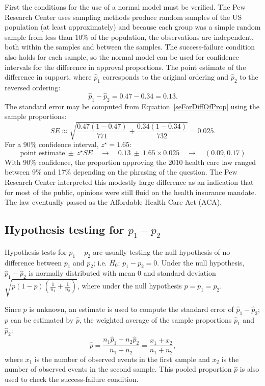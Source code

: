 \begin{example}
{}
First the conditions for the use of a normal model must be verified. The Pew Research Center uses sampling methods produce random samples of the US population (at least approximately) and because each group was a simple random sample from less than 10\% of the population, the observations are independent, both within the samples and between the samples. The success-failure condition also holds for each sample, so the normal model can be used for confidence intervals for the difference in approval proportions.  The point estimate of the difference in support, where $\hat{p}_1$ corresponds to the original ordering and $\hat{p}_2$ to the reversed ordering:
$$\hat{p}_{1} - \hat{p}_{2} = 0.47 - 0.34 = 0.13.$$
The standard error may be computed from Equation~\eqref{seForDiffOfProp} using the sample proportions:
$$SE \approx \sqrt{\frac{0.47(1-0.47)}{771} + \frac{0.34(1-0.34)}{732}} = 0.025.$$
For a 90\% confidence interval, $z^{\star} = 1.65$:
$$\text{point estimate} \ \pm\ z^{\star}SE \quad \to \quad 0.13 \ \pm\ 1.65 \times  0.025 \quad \to \quad (0.09, 0.17)$$
With 90\% confidence, the proportion approving the 2010 health care law ranged between 9\% and 17\% depending on the phrasing of the question. The Pew Research Center interpreted this modestly large difference as an indication that for most of the public, opinions were still fluid on the health insurance mandate.  The law eventually passed as the Affordable Health Care Act (ACA).
\end{example}


\subsection{Hypothesis testing for $p_1 -p_2$}

Hypothesis tests for $p_1 - p_2$ are usually testing the null hypothesis of no difference between $p_1$ and $p_2$; i.e. $H_0:\,p_1 - p_2 = 0$. Under the null hypothesis, $\hat{p}_1 - \hat{p}_2$ is normally distributed with mean 0 and standard deviation $\sqrt{p(1-p)(\frac{1}{n_1} + \frac{1}{n_2})}$, where under the null hypothesis $p = p_1 = p_2$.

Since $p$ is unknown, an estimate is used to compute the standard error of $\hat{p}_1 - \hat{p}_2$; $p$ can be estimated by $\hat{p}$, the weighted average of the sample proportions $\hat{p}_1$ and $\hat{p}_2$:
\[\hat{p} = \dfrac{n_{1}\hat{p}_1 + n_{2}\hat{p}_2}{n_{1} + n_{2}} = \dfrac{x_{1} + x_{2}}{n_{1} + n_{2}}, \]
where $x_1$ is the number of observed events in the first sample and $x_2$ is the number of observed events in the second sample. This pooled proportion $\hat{p}$ is also used to check the success-failure condition.

